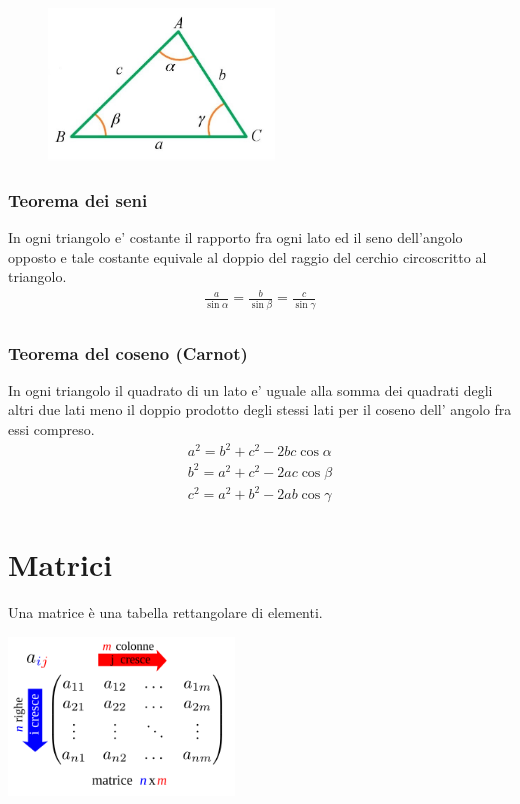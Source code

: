\documentclass[a4paper]{article}
\begin{document}
	\begin{figure}[htbp]
		\begin{center}
			\includegraphics*[width=6cm]{img/trigonometria.jpg}
		\end{center}
	\end{figure}



	\subsubsection{Teorema dei seni}
	In ogni triangolo e' costante il rapporto fra ogni lato ed il seno dell'angolo opposto e tale costante equivale al doppio del raggio del cerchio circoscritto al triangolo.
	\begin{align*}
	\frac{a}{\sin \alpha} = \frac{b}{\sin \beta} = \frac{c}{\sin \gamma}\\
	\end{align*}
	
	\subsubsection{Teorema del coseno (Carnot)}
	In ogni triangolo il quadrato di un lato e' uguale alla somma dei quadrati degli altri due lati meno il doppio prodotto degli stessi lati per il coseno dell' angolo fra essi compreso.\\
	\begin{align*}
		a^2 = b^2 + c^2 -2bc\cos \alpha\\
		b^2 = a^2 + c^2 -2ac\cos \beta\\
		c^2 = a^2 + b^2 -2ab\cos \gamma	
	\end{align*}
	
	\newpage
	\section{Matrici}
	 Una matrice è una tabella rettangolare di elementi.
	 \begin{center}
	 	\includegraphics[width=6cm]{img/matrix.png}
	 \end{center}
	 
\end{document}
